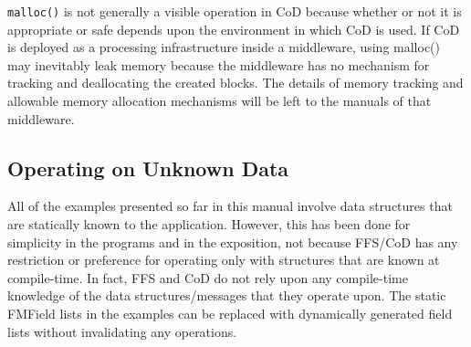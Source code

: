 {\tt malloc()} is not generally a visible operation in CoD because whether
or not it is appropriate or safe depends upon the environment in which CoD
is used.  If CoD is deployed as a processing infrastructure inside a
middleware, using malloc() may inevitably leak memory because the middleware
has no mechanism for tracking and deallocating the created blocks.  The
details of memory tracking and allowable memory allocation mechanisms will
be left to the manuals of that middleware. 

\subsection{Operating on Unknown Data}
All of the examples presented so far in this manual involve data
structures that are statically known to the application.  However,
this has been done for simplicity in the programs and in the
exposition, not because FFS/CoD has any restriction or preference for
operating only with structures that are known at compile-time.  In
fact, FFS and CoD do not rely upon any compile-time knowledge of the data
structures/messages that they operate upon.  The static FMField lists in the
examples can be replaced with dynamically generated field lists without
invalidating any operations.

